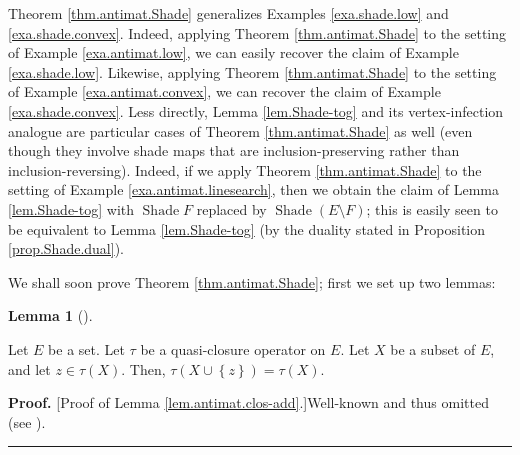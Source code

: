 \documentclass[numbers=enddot,12pt,final,onecolumn]{scrartcl}%
\theoremstyle{definition}
\newtheorem{lem}[theo]{Lemma}
\newenvironment{lemma}[1][]
{\begin{lem}[#1]\begin{leftbar}}
{\end{leftbar}\end{lem}}
\newenvironment{proof}[1][Proof]{\noindent\textbf{#1.} }{\ \rule{0.5em}{0.5em}}
\newenvironment{vershort}{}{}
\begin{document}
Theorem \ref{thm.antimat.Shade} generalizes Examples \ref{exa.shade.low} and
\ref{exa.shade.convex}. Indeed, applying Theorem \ref{thm.antimat.Shade} to
the setting of Example \ref{exa.antimat.low}, we can easily recover the claim
of Example \ref{exa.shade.low}. Likewise, applying Theorem
\ref{thm.antimat.Shade} to the setting of Example \ref{exa.antimat.convex}, we
can recover the claim of Example \ref{exa.shade.convex}. Less directly, Lemma
\ref{lem.Shade-tog} and its vertex-infection analogue are particular cases of
Theorem \ref{thm.antimat.Shade} as well (even though they involve shade maps
that are inclusion-preserving rather than inclusion-reversing). Indeed, if we
apply Theorem \ref{thm.antimat.Shade} to the setting of Example
\ref{exa.antimat.linesearch}, then we obtain the claim of Lemma
\ref{lem.Shade-tog} with $\operatorname*{Shade}F$ replaced by
$\operatorname*{Shade}\left(  E\setminus F\right)  $; this is easily seen to
be equivalent to Lemma \ref{lem.Shade-tog} (by the duality stated in
Proposition \ref{prop.Shade.dual}).

We shall soon prove Theorem \ref{thm.antimat.Shade}; first we set up two lemmas:

\begin{lemma}
\label{lem.antimat.clos-add}Let $E$ be a set. Let $\tau$ be a quasi-closure
operator on $E$. Let $X$ be a subset of $E$, and let $z\in\tau\left(
X\right)  $. Then, $\tau\left(  X\cup\left\{  z\right\}  \right)  =\tau\left(
X\right)  $.
\end{lemma}

\begin{vershort}


\begin{proof}
[Proof of Lemma \ref{lem.antimat.clos-add}.]Well-known and thus omitted (see
\cite{verlong}).
\end{proof}
\end{vershort}
\end{document}
